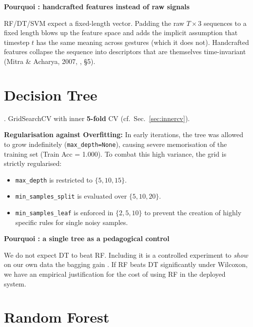 \documentclass[11pt,a4paper]{article}
\newenvironment{whybox}[1]{%
    \begin{shaded*}\noindent\textbf{Pourquoi : #1}\par\vspace{0.3em}}
    {\end{shaded*}}
\renewenvironment{shaded*}
    {\definecolor{shadecolor}{named}{whyboxbg}\begin{shaded}}
    {\end{shaded}}
\begin{document}
\begin{whybox}{handcrafted features instead of raw signals}
RF/DT/SVM expect a fixed-length vector. Padding the raw $T\times 3$
sequences to a fixed length blows up the feature space and adds the
implicit assumption that timestep $t$ has the same meaning across
gestures (which it does not). Handcrafted features collapse the
sequence into descriptors that are themselves time-invariant
(Mitra \& Acharya, 2007, \cite{mitra2007survey}, §5).
\end{whybox}

\section{Decision Tree}

\cite{quinlan1986id3, breiman1984cart}. GridSearchCV with inner \textbf{5-fold} CV
(cf.\ Sec.~\ref{sec:innercv}).

\textbf{Regularisation against Overfitting:} In early iterations, the tree was allowed to grow indefinitely (\verb|max_depth=None|), causing severe memorisation of the training set (Train Acc = 1.000). To combat this high variance, the grid is strictly regularised:
\begin{itemize}[itemsep=0.1em,topsep=0.2em]
    \item \verb|max_depth| is restricted to $\{5, 10, 15\}$.
    \item \verb|min_samples_split| is evaluated over $\{5, 10, 20\}$.
    \item \verb|min_samples_leaf| is enforced in $\{2, 5, 10\}$ to prevent the creation of highly specific rules for single noisy samples.
\end{itemize}

\begin{whybox}{a single tree as a pedagogical control}
We do not expect DT to beat RF. Including it is a controlled experiment
to \emph{show} on our own data the bagging gain
\cite{breiman2001randomforests, hastie2009elements}. If RF beats DT
significantly under Wilcoxon, we have an empirical justification for
the cost of using RF in the deployed system.
\end{whybox}

\section{Random Forest}
\end{document}
